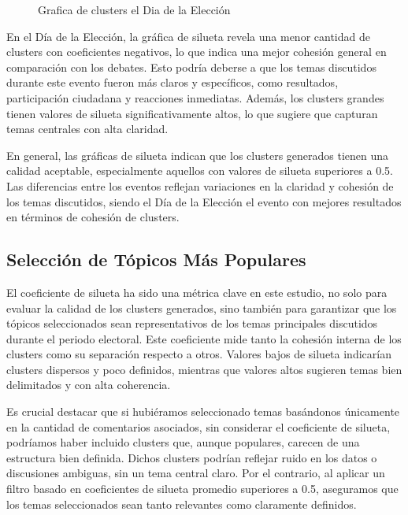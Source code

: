 \documentclass[10pt, a4paper]{article}
\begin{document}
\begin{figure}[h!]
\begin{minipage}{0.49\textwidth}
			\caption{Grafica de clusters el Dia de la Elección}
			\label{fig:clustDiaEleccion}
		\end{minipage}
	\end{figure}
	
	En el Día de la Elección, la gráfica de silueta revela una menor cantidad de clusters con coeficientes negativos, lo que indica una mejor cohesión general en comparación con los debates. Esto podría deberse a que los temas discutidos durante este evento fueron más claros y específicos, como resultados, participación ciudadana y reacciones inmediatas. Además, los clusters grandes tienen valores de silueta significativamente altos, lo que sugiere que capturan temas centrales con alta claridad.
	
	En general, las gráficas de silueta indican que los clusters generados tienen una calidad aceptable, especialmente aquellos con valores de silueta superiores a 0.5. Las diferencias entre los eventos reflejan variaciones en la claridad y cohesión de los temas discutidos, siendo el Día de la Elección el evento con mejores resultados en términos de cohesión de clusters.
	
	\subsection{Selección de Tópicos Más Populares}
	
	El coeficiente de silueta ha sido una métrica clave en este estudio, no solo para evaluar la calidad de los clusters generados, sino también para garantizar que los tópicos seleccionados sean representativos de los temas principales discutidos durante el periodo electoral. Este coeficiente mide tanto la cohesión interna de los clusters como su separación respecto a otros. Valores bajos de silueta indicarían clusters dispersos y poco definidos, mientras que valores altos sugieren temas bien delimitados y con alta coherencia.
	
	Es crucial destacar que si hubiéramos seleccionado temas basándonos únicamente en la cantidad de comentarios asociados, sin considerar el coeficiente de silueta, podríamos haber incluido clusters que, aunque populares, carecen de una estructura bien definida. Dichos clusters podrían reflejar ruido en los datos o discusiones ambiguas, sin un tema central claro. Por el contrario, al aplicar un filtro basado en coeficientes de silueta promedio superiores a 0.5, aseguramos que los temas seleccionados sean tanto relevantes como claramente definidos.
	
\end{document}
